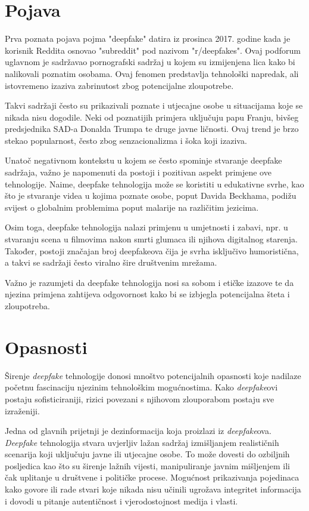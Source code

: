 \documentclass[seminarski, times, utf8]{fer}
\begin{document}
\section{Pojava}

Prva poznata pojava pojma "deepfake" datira iz prosinca 2017. godine kada je korisnik Reddita osnovao "subreddit" pod nazivom "r/deepfakes".%
Ovaj podforum uglavnom je sadržavao pornografski sadržaj u kojem su izmijenjena lica kako bi nalikovali poznatim osobama. Ovaj fenomen predstavlja tehnološki napredak, ali istovremeno izaziva zabrinutost zbog potencijalne zloupotrebe.

Takvi sadržaji često su prikazivali poznate i utjecajne osobe u situacijama koje se nikada nisu dogodile. Neki od poznatijih primjera uključuju papu Franju, bivšeg predsjednika SAD-a Donalda Trumpa te druge javne ličnosti. Ovaj trend je brzo stekao popularnost, često zbog senzacionalizma i šoka koji izaziva.

Unatoč negativnom kontekstu u kojem se često spominje stvaranje deepfake sadržaja, važno je napomenuti da postoji i pozitivan aspekt primjene ove tehnologije. Naime, deepfake tehnologija može se koristiti u edukativne svrhe, kao što je stvaranje videa u kojima poznate osobe, poput Davida Beckhama, podižu svijest o globalnim problemima poput malarije na različitim jezicima.

Osim toga, deepfake tehnologija nalazi primjenu u umjetnosti i zabavi, npr. u stvaranju scena u filmovima nakon smrti glumaca ili njihova digitalnog starenja. Također, postoji značajan broj deepfakeova čija je svrha isključivo humoristična, a takvi se sadržaji često viralno šire društvenim mrežama.

Važno je razumjeti da deepfake tehnologija nosi sa sobom i etičke izazove te da njezina primjena zahtijeva odgovornost kako bi se izbjegla potencijalna šteta i zloupotreba.
\section{Opasnosti}

Širenje \textit{deepfake} tehnologije donosi mnoštvo potencijalnih opasnosti koje nadilaze početnu fascinaciju njezinim tehnološkim mogućnostima. Kako \textit{deepfake}ovi postaju sofisticiraniji, rizici povezani s njihovom zlouporabom postaju sve izraženiji. 

Jedna od glavnih prijetnji je dezinformacija koja proizlazi iz \textit{deepfake}ova. \textit{Deepfake} tehnologija stvara uvjerljiv lažan sadržaj izmišljanjem realističnih scenarija koji uključuju javne ili utjecajne osobe. To može dovesti do ozbiljnih posljedica kao što su širenje lažnih vijesti, manipuliranje javnim mišljenjem ili čak uplitanje u društvene i političke procese. Mogućnost prikazivanja pojedinaca kako govore ili rade stvari koje nikada nisu učinili ugrožava integritet informacija i dovodi u pitanje autentičnost i vjerodostojnost medija i vlasti.
\end{document}
